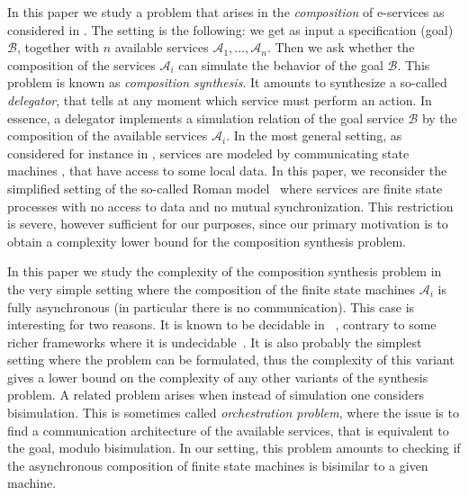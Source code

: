 \documentclass{LMCS}
\theoremstyle{plain}\newtheorem{remark}{Remark}
\theoremstyle{plain}\newtheorem{lemma}[thm]{Lemma}
\renewcommand{\Aa}{\mathcal{A}}
\renewcommand{\Bb}{\mathcal{B}}
\begin{document}
In this paper we study a problem that arises in the \emph{composition}
of e-services as considered in \cite{BCGLM03,BCGHM05,vldb05}. The
setting is the following: we get as input a specification (goal)
$\Bb$, together with $n$ available services $\Aa_1,\ldots,\Aa_n$. Then
we ask whether the composition of the services $\Aa_i$ can simulate
the behavior of the goal $\Bb$. This problem is known as
\emph{composition synthesis}. It amounts to synthesize a so-called
\emph{delegator}, that tells at any moment which service must perform
an action. In essence, a delegator implements a simulation relation of
the goal service $\Bb$ by the composition of the available services
$\Aa_i$.  In the most general setting, as considered for instance in
\cite{hbcs03,fbs04,dsv06}, services are modeled by communicating state
machines \cite{bz83}, that have access to some local data. In this
paper, we reconsider the simplified setting of the so-called Roman
model~\cite{BCGLM03} where services are finite state processes with no
access to data and no mutual synchronization. This restriction is
severe, however sufficient for our purposes, since our primary
motivation is to obtain a complexity lower bound for the composition
synthesis problem.


In this paper we study the complexity of the composition synthesis
problem in the very simple setting where the composition of the finite
state machines $\Aa_i$ is fully asynchronous (in particular there is
no communication). This case is interesting for two reasons. It is
known to be decidable in \EXPTIME~\cite{BCGLM03}, contrary to some
richer frameworks where it is undecidable~\cite{BCGHM05}. It is also
probably the simplest setting where the problem can be formulated,
thus the complexity of this variant gives a lower bound on the
complexity of any other variants of the synthesis problem.  A related
problem arises when instead of simulation one considers bisimulation.
This is sometimes called \emph{orchestration problem}, where the issue
is to find a communication architecture of the available services,
that is equivalent to the goal, modulo bisimulation. In our setting,
this problem amounts to checking if the asynchronous composition of
finite state machines is bisimilar to a given machine.
\end{document}
